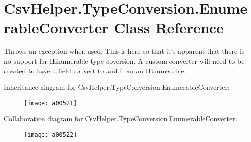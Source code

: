 \hypertarget{a00089}{\section{Csv\-Helper.\-Type\-Conversion.\-Enumerable\-Converter Class Reference}
\label{a00089}
}


Throws an exception when used. This is here so that it's apparent that there is no support for I\-Enumerable type coversion. A custom converter will need to be created to have a field convert to and from an I\-Enumerable.  




Inheritance diagram for Csv\-Helper.\-Type\-Conversion.\-Enumerable\-Converter\-:
\nopagebreak
\begin{figure}[H]
\begin{center}
\leavevmode
\texttt{[image: a00521]}
\end{center}
\end{figure}


Collaboration diagram for Csv\-Helper.\-Type\-Conversion.\-Enumerable\-Converter\-:
\nopagebreak
\begin{figure}[H]
\begin{center}
\leavevmode
\texttt{[image: a00522]}
\end{center}
\end{figure}
